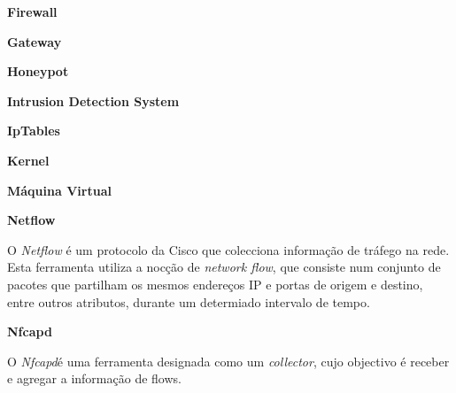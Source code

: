 \label{appendix:1}
\begin{description}
    \item \textbf{Firewall}
\end{description}

\begin{description}
    \item \textbf{Gateway}
\end{description}

\begin{description}
    \item \textbf{Honeypot}
\end{description}

\begin{description}
    \item \textbf{Intrusion Detection System}
\end{description}

\begin{description}
    \item \textbf{IpTables}
\end{description}

\begin{description}
    \item \textbf{Kernel}
\end{description}

\begin{description}
    \item \textbf{Máquina Virtual}
\end{description}

\begin{description}
    \item \textbf{Netflow}

O \textit{Netflow} é um protocolo da Cisco que colecciona informação de tráfego na rede. Esta ferramenta utiliza a nocção de \textit{network flow}, que consiste num conjunto de pacotes que partilham os mesmos endereços IP e portas de origem e destino, entre outros atributos, durante um determiado intervalo de tempo. 
\end{description}

\begin{description}
    \item \textbf{Nfcapd}

O \textit{Nfcapd}é uma ferramenta designada como um \textit{collector}, cujo objectivo é receber e agregar a informação de flows.
\end{description}

